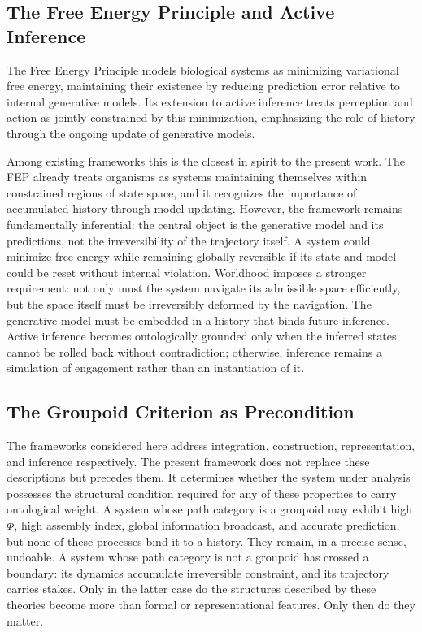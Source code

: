 \documentclass[11pt]{article}
\theoremstyle{definition}
\theoremstyle{remark}
\begin{document}
\subsection{The Free Energy Principle and Active Inference}

The Free Energy Principle models biological systems as minimizing variational free energy,
maintaining their existence by reducing prediction error relative to internal generative
models. Its extension to active inference treats perception and action as jointly
constrained by this minimization, emphasizing the role of history through the ongoing
update of generative models.

Among existing frameworks this is the closest in spirit to the present work. The FEP
already treats organisms as systems maintaining themselves within constrained regions of
state space, and it recognizes the importance of accumulated history through model
updating. However, the framework remains fundamentally inferential: the central object
is the generative model and its predictions, not the irreversibility of the trajectory
itself. A system could minimize free energy while remaining globally reversible if its
state and model could be reset without internal violation. Worldhood imposes a stronger
requirement: not only must the system navigate its admissible space efficiently, but
the space itself must be irreversibly deformed by the navigation. The generative model
must be embedded in a history that binds future inference. Active inference becomes
ontologically grounded only when the inferred states cannot be rolled back without
contradiction; otherwise, inference remains a simulation of engagement rather than an
instantiation of it.

\subsection{The Groupoid Criterion as Precondition}

The frameworks considered here address integration, construction, representation, and
inference respectively. The present framework does not replace these descriptions but
precedes them. It determines whether the system under analysis possesses the structural
condition required for any of these properties to carry ontological weight. A system
whose path category is a groupoid may exhibit high $\Phi$, high assembly index, global
information broadcast, and accurate prediction, but none of these processes bind it to
a history. They remain, in a precise sense, undoable. A system whose path category is
not a groupoid has crossed a boundary: its dynamics accumulate irreversible constraint,
and its trajectory carries stakes. Only in the latter case do the structures described
by these theories become more than formal or representational features. Only then do
they matter.
\end{document}
